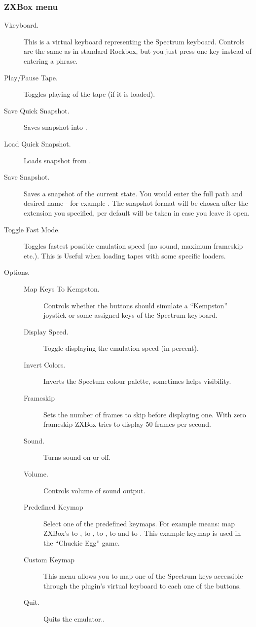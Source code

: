 \subsubsection{ZXBox menu}
\begin{description}
\item[ Vkeyboard.]
    This is a virtual keyboard representing the Spectrum keyboard. Controls are
    the same as in standard Rockbox, but you just press one key instead of
    entering a phrase.
\item[Play/Pause Tape.] Toggles playing of the tape (if it is loaded).
\item[Save Quick Snapshot.] Saves snapshot into .
\item[Load Quick Snapshot.] Loads snapshot from .
\item[Save Snapshot.]
    Saves a snapshot of the current state. You would enter the full path and
    desired name - for example . The
    snapshot format will be chosen after the extension you specified, per
    default  will be taken in case you leave it open.
\item[Toggle Fast Mode.]
    Toggles fastest possible emulation speed (no sound, maximum frameskip etc.).
    This is Useful when loading tapes with some specific loaders.
\item[Options.]
    \begin{description}
    \item[Map Keys To Kempston.]
        Controls whether the \daps{} buttons should simulate a ``Kempston''
        joystick or some assigned keys of the Spectrum keyboard.
    \item[Display Speed.]Toggle displaying the emulation speed (in percent).
    \item[Invert Colors.]
        Inverts the Spectum colour palette, sometimes helps visibility.
    \item[Frameskip]
        Sets the number of frames to skip before displaying one. With zero
        frameskip ZXBox tries to display 50 frames per second.
    \item[Sound.]Turns sound on or off.
    \item[Volume.]Controls volume of sound output.
    \item[Predefined Keymap]
        Select one of the predefined keymaps. For example  means:
        map ZXBox's  to ,  to ,
         to ,  to  and
         to . This example keymap is used in the
        ``Chuckie Egg'' game.
    \item[Custom Keymap]
        This menu allows you to map one of the Spectrum keys accessible through the 
        plugin's virtual keyboard to each one of the buttons.
    \item[Quit.] Quits the emulator..
    \end{description}
\end{description}

